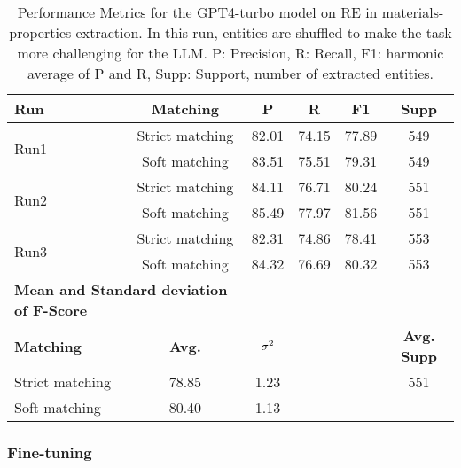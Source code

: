 \begin{table}[htbp]
    \small
    \centering
    \caption{Performance Metrics for the GPT4-turbo model on RE in materials-properties extraction. In this run, entities are shuffled to make the task more challenging for the LLM. P: Precision, R: Recall, F1: harmonic average of P and R, Supp: Support, number of extracted entities.}
    \begin{tabular}{lccccc}
        \toprule
        \textbf{Run} & \textbf{Matching} & \textbf{P} & \textbf{R} & \textbf{F1} & \textbf{Supp} \\
        \midrule
        \multirow{2}{*}{Run1} & Strict matching & 82.01 & 74.15 & 77.89 & 549 \\
        & Soft matching & 83.51 & 75.51 & 79.31 & 549 \\
        \midrule
        \multirow{2}{*}{Run2} & Strict matching & 84.11 & 76.71 & 80.24 & 551 \\
        & Soft matching & 85.49 & 77.97 & 81.56 & 551 \\
        \midrule
        \multirow{2}{*}{Run3} & Strict matching & 82.31 & 74.86 & 78.41 & 553 \\
        & Soft matching & 84.32 & 76.69 & 80.32 & 553 \\
        \midrule
        \multicolumn{2}{l}{\textbf{Mean and Standard deviation of F-Score}} & & & & \\
        \midrule
        \textbf{Matching} & \textbf{Avg.} & $\sigma\textsuperscript{2}$ & & & \textbf{Avg. Supp}\\
        Strict matching & 78.85 & 1.23 & & & 551 \\
        Soft matching & 80.40 & 1.13 & & \\
        \bottomrule
    \end{tabular}
\end{table}

\clearpage
\subsubsection{Fine-tuning}

